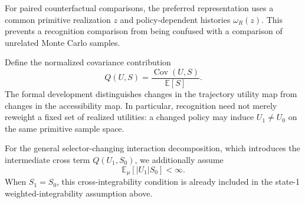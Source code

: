 For paired counterfactual comparisons, the preferred representation uses a common primitive realization $z$ and policy-dependent histories $\omega_R(z)$. This prevents a recognition comparison from being confused with a comparison of unrelated Monte Carlo samples.

Define the normalized covariance contribution
\[
Q(U,S)
=
\frac{\operatorname{Cov}(U,S)}{\mathbb E[S]}.
\]
The formal development distinguishes changes in the trajectory utility map from changes in the accessibility map. In particular, recognition need not merely reweight a fixed set of realized utilities: a changed policy may induce $U_1\neq U_0$ on the same primitive sample space.

For the general selector-changing interaction decomposition, which introduces the intermediate cross term $Q(U_1,S_0)$, we additionally assume
\[
\mathbb E_\mu[|U_1|S_0]<\infty.
\]
When $S_1=S_0$, this cross-integrability condition is already included in the state-1 weighted-integrability assumption above.
